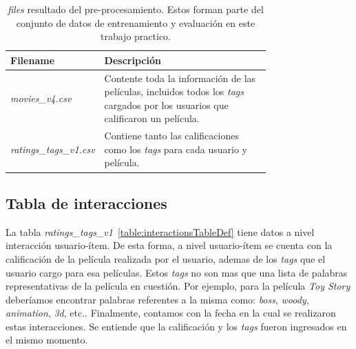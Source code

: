 \documentclass[11pt,a4paper,twoside]{thesis}
\begin{document}
\begin{table}[!htb]
	\centering
	\footnotesize
	\begin{tabular}{l | p{0.75\linewidth}}
		\hline
		Filename                       & Descripción                                                                                                                             \\
		\hline
		\textit{movies\_v4.csv}        & Contente toda la información de las películas, incluidos todos los \textit{tags} cargados por los usuarios que calificaron un película. \\
		\textit{ratings\_tags\_v1.csv} & Contiene tanto las calificaciones como los \textit{tags} para cada usuario y película.                                                  \\
		\hline
	\end{tabular}
	\caption{
		\textit{files} resultado del pre-procesamiento. Estos forman parte del conjunto de datos de entrenamiento y evaluación en este trabajo practico.
	}
	\label{table:tableFiles}
\end{table}

\subsection{Tabla de interacciones}

La tabla \textit{ratings\_tags\_v1}~\ref{table:interactionsTableDef} tiene
datos a nivel interacción usuario-ítem. De esta forma, a nivel usuario-ítem se
cuenta con la calificación de la película realizada por el usuario, ademas de
los \textit{tags} que el usuario cargo para esa películas. Estos \textit{tags}
no son mas que una lista de palabras representativas de la película en
cuestión. Por ejemplo, para la película \textit{Toy Story} deberíamos encontrar
palabras referentes a la misma como: \textit{boss}, \textit{woody}, \textit{animation},
\textit{3d}, etc.. Finalmente, contamos con la fecha en la cual se realizaron
estas interacciones. Se entiende que la calificación y los \textit{tags} fueron
ingresados en el mismo momento.
\end{document}
